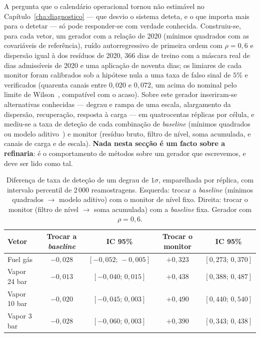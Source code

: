 A pergunta que o calendário operacional tornou não estimável no
Capítulo~\ref{cha:diagnostico} --- que desvio o sistema deteta, e o que
importa mais para o detetar --- só pode responder-se com verdade conhecida.
Construiu-se, para cada vetor, um gerador com a relação de 2020 (mínimos
quadrados com as covariáveis de referência), ruído autorregressivo de
primeira ordem com $\rho = 0{,}6$ e dispersão igual à dos resíduos de 2020,
366 dias de treino com a máscara real de dias admissíveis de 2020 e uma
aplicação de noventa dias; os limiares de cada monitor foram calibrados sob
a hipótese nula a uma taxa de falso sinal de $5\%$ e verificados (quarenta
canais entre $0{,}020$ e $0{,}072$, um acima do nominal pelo limite de
Wilson~\cite{Wilson1927}, compatível com o acaso). Sobre este gerador inseriram-se
alternativas conhecidas --- degrau e rampa de uma escala, alargamento da
dispersão, recuperação, resposta à carga --- em quatrocentas réplicas por
célula, e mediu-se a taxa de deteção de cada combinação de \emph{baseline}
(mínimos quadrados ou modelo aditivo~\cite{HastieTibshirani1986,Wood2017}) e
monitor (resíduo bruto, filtro de
nível, soma acumulada, e canais de carga e de escala). \textbf{Nada nesta
secção é um facto sobre a refinaria}: é o comportamento de métodos sobre um
gerador que escrevemos, e deve ser lido como tal.

\begin{table}[htbp]
  \centering
  \caption[Contrastes co-primários com verdade conhecida]{Diferença de taxa
  de deteção de um degrau de $1\sigma$, emparelhada por réplica, com intervalo
  percentil de 2\,000 reamostragens. Esquerda: trocar a \emph{baseline}
  (mínimos quadrados $\to$ modelo aditivo) com o monitor de nível fixo.
  Direita: trocar o monitor (filtro de nível $\to$ soma acumulada) com a
  \emph{baseline} fixa. Gerador com $\rho = 0{,}6$.}
  \label{tab:coprimarias}
  \begin{tabular}{lcccc}
    \toprule
    Vetor & Trocar a \emph{baseline} & IC 95\% & Trocar o monitor & IC 95\% \\
    \midrule
    Fuel gás     & $-0{,}028$ & $[-0{,}052;\,-0{,}005]$ & $+0{,}323$ & $[0{,}273;\,0{,}370]$ \\
    Vapor 24 bar & $-0{,}013$ & $[-0{,}040;\,0{,}015]$  & $+0{,}438$ & $[0{,}388;\,0{,}487]$ \\
    Vapor 10 bar & $-0{,}020$ & $[-0{,}045;\,0{,}003]$  & $+0{,}490$ & $[0{,}440;\,0{,}540]$ \\
    Vapor 3 bar  & $-0{,}028$ & $[-0{,}060;\,0{,}003]$  & $+0{,}390$ & $[0{,}343;\,0{,}438]$ \\
    \bottomrule
  \end{tabular}
\end{table}

